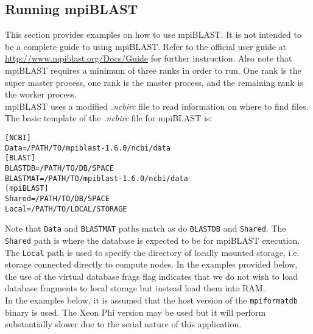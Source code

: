 \documentclass[10pt]{article}
\begin{document}
\subsection{Running mpiBLAST} \label{ssec:runmpi}

This section provides examples on how to use mpiBLAST.  It is not intended to be a complete guide to using mpiBLAST.  Refer to the official user guide at \url{http://www.mpiblast.org/Docs/Guide} for further instruction.  Also note that mpiBLAST requires a minimum
of three ranks in order to run.  One rank is the super master process, one rank is the master process, and the remaining rank is the worker process.\\

  mpiBLAST uses a modified \emph{.ncbirc} file to read information on where to find files.  The basic template of the \emph{.ncbirc} file for mpiBLAST is:
\begin{verbatim}
[NCBI]
Data=/PATH/TO/mpiblast-1.6.0/ncbi/data
[BLAST]
BLASTDB=/PATH/TO/DB/SPACE
BLASTMAT=/PATH/TO/mpiblast-1.6.0/ncbi/data
[mpiBLAST]
Shared=/PATH/TO/DB/SPACE
Local=/PATH/TO/LOCAL/STORAGE
\end{verbatim}
Note that \verb^Data^ and \verb^BLASTMAT^ paths match as do \verb^BLASTDB^ and \verb^Shared^.  The \verb^Shared^ path is where the database is expected to be for mpiBLAST execution.  The \verb^Local^
path is used to specify the directory of locally mounted storage, i.e. storage connected directly to compute nodes.  In the examples provided below, the use of the virtual database frags flag indicates that we do not
wish to load database fragments to local storage but instead load them into RAM.\\

 In the examples below, it is assumed that the host version of the \verb^mpiformatdb^ binary is used. The Xeon Phi version may be used but it will perform substantially slower due to the serial
nature of this application.\\
\end{document}
